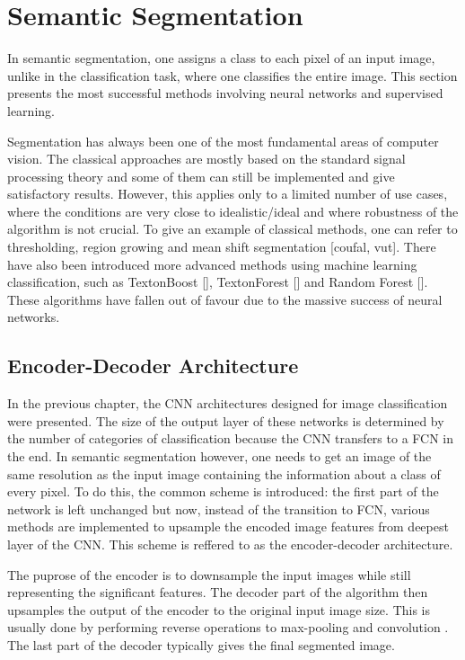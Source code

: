 \section{Semantic Segmentation}

In semantic segmentation, one assigns a class to each pixel of an input image, unlike in the classification task, where one classifies the entire image. This section presents the most successful methods involving neural networks and supervised learning. 

Segmentation has always been one of the most fundamental areas of computer vision. The classical approaches are mostly based on the standard signal processing theory and some of them can still be implemented and give satisfactory results. However, this applies only to a limited number of use cases, where the conditions are very close to idealistic/ideal and where robustness of the algorithm is not crucial. To give an example of classical methods, one can refer to thresholding, region growing and mean shift segmentation [coufal, vut]. There have also been introduced more advanced methods using machine learning classification, such as TextonBoost [], TextonForest [] and Random Forest []. These algorithms have fallen out of favour due to the massive success of neural networks.

\subsection{Encoder-Decoder Architecture}

In the previous chapter, the CNN architectures designed for image classification were presented. The size of the output layer of these networks is determined by the number of categories of classification because the CNN transfers to a FCN in the end. In semantic segmentation however, one needs to get an image of the same resolution as the input image containing the information about a class of every pixel. To do this, the common scheme is introduced: the first part of the network is left unchanged but now, instead of the transition to FCN, various methods are implemented to upsample the encoded image features from deepest layer of the CNN. This scheme is reffered to as the encoder-decoder architecture. 

The puprose of the encoder is to downsample the input images while still representing the significant features. The decoder part of the algorithm then upsamples the output of the encoder to the original input image size. This is usually done by performing reverse operations to max-pooling and convolution . The last part of the decoder typically gives the final segmented image. 

